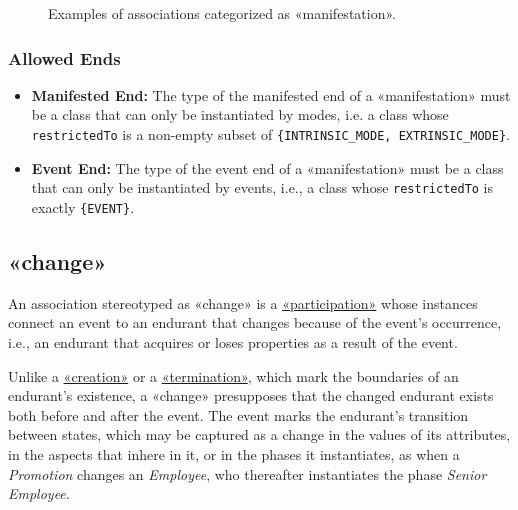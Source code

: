\begin{figure}[h]
    \centering
    
    \caption{Examples of associations categorized as «manifestation».}
    \label{fig:manifestation-example}
\end{figure}


\subsubsection{Allowed Ends}

\begin{itemize}
    \item \textbf{Manifested End:} The type of the manifested end of a «manifestation» must be a class that can only be instantiated by modes, i.e. a class whose \texttt{restrictedTo} is a non-empty subset of \texttt{\{INTRINSIC\_MODE, EXTRINSIC\_MODE\}}.
    \item \textbf{Event End:} The type of the event end of a «manifestation» must be a class that can only be instantiated by events, i.e., a class whose \texttt{restrictedTo} is exactly \texttt{\{EVENT\}}.
\end{itemize}




\subsection{«change»}
\label{stereotype:change}
 
An association stereotyped as «change» is a \hyperref[stereotype:participation]{«participation»} whose instances connect an event to an endurant that changes because of the event's occurrence, i.e., an endurant that acquires or loses properties as a result of the event.
 
Unlike a \hyperref[stereotype:creation]{«creation»} or a \hyperref[stereotype:termination]{«termination»}, which mark the boundaries of an endurant's existence, a «change» presupposes that the changed endurant exists both before and after the event. The event marks the endurant's transition between states, which may be captured as a change in the values of its attributes, in the aspects that inhere in it, or in the phases it instantiates, as when a \textit{Promotion} changes an \textit{Employee}, who thereafter instantiates the phase \textit{Senior Employee}.
 
